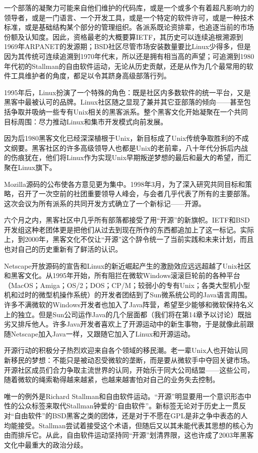 \documentclass[12pt,oneside]{book}
\begin{document}
一个部落的凝聚力可能来自他们维护的代码库，或是一个或多个有着超凡影响力的领导者，或是一门语言、一个开发工具，或是一个特定的软件许可，或是一种技术标准，或是基础结构某个部分的管理组织。各派系既论资排辈，也追逐当前的市场份额及认知度。因此，资格最老的大概要算IETF，其历史可以连续追根溯源到1969年ARPANET的发源期；BSD社区尽管市场安装数量要比Linux少得多，但是因为其传统可连续追溯到1970年代末，所以还是拥有相当高的声望；可追溯到1980年代初的Stallman的自由软件运动，无论从历史贡献，还是从作为几个最常用的软件工具维护者的角度，都足以令其跻身高级部落行列。

1995年后，Linux扮演了一个特殊的角色：既是社区内多数软件的统一平台，又是黑客中最被认可的品牌。Linux社区随之显现了兼并其它亚部落的倾向——甚至包括争取并吸纳一些专有Unix相关的黑客派系。整个黑客文化开始凝聚在一个共同目标周围：尽力推动Linux和集市开发模式向前发展。

因为后1980黑客文化已经深深植根于Unix，新目标成了Unix传统争取胜利的不成文纲要。黑客社区的许多高级领导人也都是Unix的老前辈，八十年代分拆后内战的伤痕犹在，他们将Linux作为实现Unix早期叛逆梦想的最后和最大的希望，而汇聚在Linux旗下。

Mozilla源码的公布使各方意见更为集中。1998年3月，为了深入研究共同目标和策略，召开了一次空前的社团重要领导人峰会，与会者几乎代表了所有的主要部落。这次会议为所有派系的共同开发方式确立了一个新标记——开源。

六个月之内，黑客社区中几乎所有部落都接受了用“开源”的新旗帜。IETF和BSD开发组这种老团体更是把他们从过去到现在所作的东西都追加上了这一标记。实际上，到2000年，黑客文化不仅让“开源”这个辞令统一了当前实践和未来计划，而且也对自己的历史重新有了鲜活的认识。

Netscape开放源码的宣告和Linux的新近崛起产生的激励效应远远超越了Unix社区和黑客文化。从1995年开始，所有阻拦在微软Windows滚滚巨轮前的各种平台（MacOS；Amiga；OS/2；DOS；CP/M；较弱小的专有Unix；各类大型机小型机和过时的微型机操作系统）的开发者团结到了Sun微系统公司的Java语言周围。许多不满微软的Windows开发者也加入了Java阵营，希望至少能够和微软保持名义上的独立。但是Sun公司运作Java的几个层面都（我们将在第14章予以讨论）既拙劣又排斥他人。许多Java开发者喜欢上了开源运动中的新生事物，于是就像此前跟随Netscape加入Java一样，又跟随它加入了Linux和开源运动。

开源行动的积极分子热烈欢迎来自各个领域的移民潮。老一辈Unix人也开始认同新移民的梦想：不能只是被动忍受微软的垄断，而是要从微软手中夺回关键市场。开源社区成员们合力争取主流世界的认同，开始乐于同大公司结盟——这些公司，随着微软的绳索勒得越来越紧，也越来越害怕对自己的业务失去控制。

唯一的例外是Richard Stallman和自由软件运动。“开源”明显要用一个意识形态中性的公众标签来取代Stallman钟爱的“自由软件”。新标签无论对于历史上一贯反对“自由软件”的BSD黑客之类的团体，还是对于不愿在GPL是非之争中表态的人均能接受。Stallman尝试着接受这个术语，但随后又以其未能代表其思想的核心为由而排斥它。从此，自由软件运动坚持同“开源”划清界限，这也许成了2003年黑客文化中最重大的政治分歧。
\end{document}
